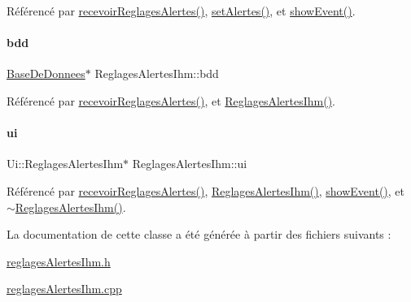 Référencé par \hyperlink{class_reglages_alertes_ihm_a5c40f718b28b948a90574ef0c2d3e587}{recevoir\+Reglages\+Alertes()}, \hyperlink{class_reglages_alertes_ihm_aeb0331a6103f944cb15cdd62985ca231}{set\+Alertes()}, et \hyperlink{class_reglages_alertes_ihm_af47504b34ab0213fce9269c08b9e5544}{show\+Event()}.

\mbox{\label{class_reglages_alertes_ihm_a91b511776c98009cf8f951ec9f3e564e}} 
\paragraph{\texorpdfstring{bdd}{bdd}}
{\footnotesize\ttfamily \hyperlink{class_base_de_donnees}{Base\+De\+Donnees}$\ast$ Reglages\+Alertes\+Ihm\+::bdd\hspace{0.3cm}{\ttfamily [private]}}



Référencé par \hyperlink{class_reglages_alertes_ihm_a5c40f718b28b948a90574ef0c2d3e587}{recevoir\+Reglages\+Alertes()}, et \hyperlink{class_reglages_alertes_ihm_ae6337f2d05a3184e48bf5022a91f06c7}{Reglages\+Alertes\+Ihm()}.

\mbox{\label{class_reglages_alertes_ihm_af3a1fcc84fb1c76248b330372947b245}} 
\paragraph{\texorpdfstring{ui}{ui}}
{\footnotesize\ttfamily Ui\+::\+Reglages\+Alertes\+Ihm$\ast$ Reglages\+Alertes\+Ihm\+::ui\hspace{0.3cm}{\ttfamily [private]}}



Référencé par \hyperlink{class_reglages_alertes_ihm_a5c40f718b28b948a90574ef0c2d3e587}{recevoir\+Reglages\+Alertes()}, \hyperlink{class_reglages_alertes_ihm_ae6337f2d05a3184e48bf5022a91f06c7}{Reglages\+Alertes\+Ihm()}, \hyperlink{class_reglages_alertes_ihm_af47504b34ab0213fce9269c08b9e5544}{show\+Event()}, et \hyperlink{class_reglages_alertes_ihm_aa9bfc09b4162f536de84d218daa36982}{$\sim$\+Reglages\+Alertes\+Ihm()}.



La documentation de cette classe a été générée à partir des fichiers suivants \+:\begin{DoxyCompactItemize}
\item 
\hyperlink{reglages_alertes_ihm_8h}{reglages\+Alertes\+Ihm.\+h}\item 
\hyperlink{reglages_alertes_ihm_8cpp}{reglages\+Alertes\+Ihm.\+cpp}\end{DoxyCompactItemize}

